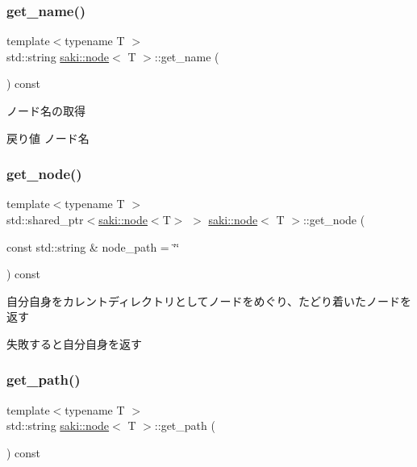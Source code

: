 \subsubsection{\texorpdfstring{get\+\_\+name()}{get\_name()}}
{\footnotesize\ttfamily template$<$typename T $>$ \\
std\+::string \mbox{\hyperlink{classsaki_1_1node}{saki\+::node}}$<$ T $>$\+::get\+\_\+name (\begin{DoxyParamCaption}{ }\end{DoxyParamCaption}) const\hspace{0.3cm}{\ttfamily [inline]}}



ノード名の取得 

\begin{DoxyReturn}{戻り値}
ノード名 
\end{DoxyReturn}
\mbox{\label{classsaki_1_1node_a7a485b3342124b691167a83caeacdb7c}} 
\subsubsection{\texorpdfstring{get\+\_\+node()}{get\_node()}}
{\footnotesize\ttfamily template$<$typename T $>$ \\
std\+::shared\+\_\+ptr$<$\mbox{\hyperlink{classsaki_1_1node}{saki\+::node}}$<$T$>$ $>$ \mbox{\hyperlink{classsaki_1_1node}{saki\+::node}}$<$ T $>$\+::get\+\_\+node (\begin{DoxyParamCaption}\item[{const std\+::string \&}]{node\+\_\+path = {\ttfamily \char`\"{}\char`\"{}} }\end{DoxyParamCaption}) const\hspace{0.3cm}{\ttfamily [inline]}}



自分自身をカレントディレクトリとしてノードをめぐり、たどり着いたノードを返す 

失敗すると自分自身を返す \mbox{\label{classsaki_1_1node_a9066f322842144c7d8acc3165c3130a7}} 
\subsubsection{\texorpdfstring{get\+\_\+path()}{get\_path()}}
{\footnotesize\ttfamily template$<$typename T $>$ \\
std\+::string \mbox{\hyperlink{classsaki_1_1node}{saki\+::node}}$<$ T $>$\+::get\+\_\+path (\begin{DoxyParamCaption}{ }\end{DoxyParamCaption}) const\hspace{0.3cm}{\ttfamily [inline]}}



